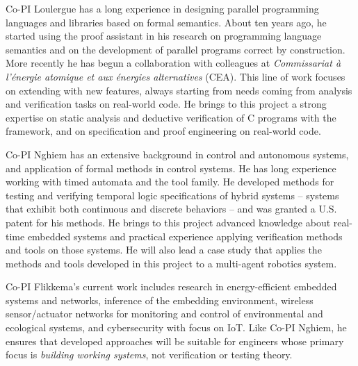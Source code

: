 Co-PI Loulergue has a long experience in designing parallel programming languages and libraries based on formal semantics. About ten years ago, he started using the \Coq proof assistant in his research on programming language semantics and on the development of parallel programs correct by construction. More recently he has begun a collaboration with colleagues at {\it Commissariat \`a l'\'energie atomique et aux \'energies alternatives} (CEA). This line of work focuses on extending \framac with new features, always starting from needs coming from analysis and verification tasks on real-world code. He brings to this project a strong expertise on static analysis and deductive verification of C programs with the \framac framework, and on specification and proof engineering on real-world code. 

Co-PI Nghiem has an extensive background in control and autonomous systems, and application of formal methods in control systems.
He has long experience working with timed automata and the \uppaal tool family.
He developed methods for testing and verifying temporal logic specifications of hybrid systems -- systems that exhibit both continuous and discrete behaviors -- and was granted a U.S. patent for his methods.
He brings to this project advanced knowledge about real-time embedded systems and practical experience applying verification methods and tools on those systems.
He will also lead a case study that applies the methods and tools developed in this project to a multi-agent robotics system.

Co-PI Flikkema's current work includes research in energy-efficient embedded systems and networks, inference of the embedding environment, wireless sensor/actuator networks for monitoring and control of environmental and ecological systems, and cybersecurity with focus on IoT.  Like Co-PI Nghiem, he ensures that developed approaches will be suitable for engineers whose primary focus is \emph{building working systems}, not verification or testing theory.